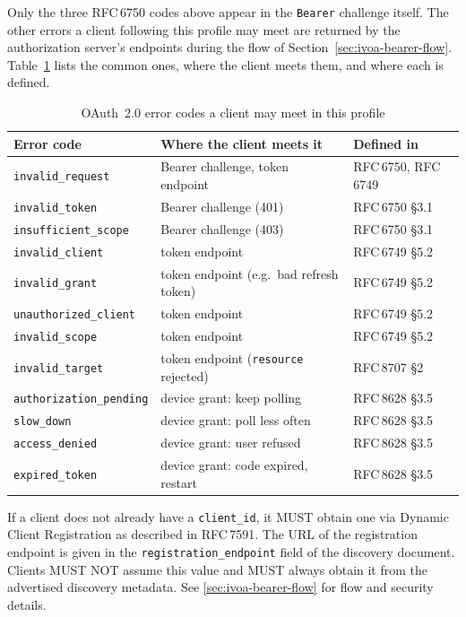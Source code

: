 \documentclass[11pt,a4paper]{ivoa}
\newcommand{\rfc}[1]{RFC\,#1}
\begin{document}
Only the three \rfc{6750} codes above appear in the \verb|Bearer| challenge
itself. The other errors a client following this profile may meet are
returned by the authorization server's endpoints during the flow of
Section~\ref{sec:ivoa-bearer-flow}. Table~\ref{table:oAuthCodes} lists the
common ones, where the client meets them, and where each is defined.
\begin{table}[]
\centering
\small
\begin{tabular}{lll}
\textbf{Error code} & \textbf{Where the client meets it} & \textbf{Defined in} \\
\hline
{\tt invalid\_request} & Bearer challenge, token endpoint & \rfc{6750}, \rfc{6749} \\
{\tt invalid\_token} & Bearer challenge (401) & \rfc{6750} \S3.1 \\
{\tt insufficient\_scope} & Bearer challenge (403) & \rfc{6750} \S3.1 \\
\hline
{\tt invalid\_client} & token endpoint & \rfc{6749} \S5.2 \\
{\tt invalid\_grant} & token endpoint (e.g.\ bad refresh token) & \rfc{6749} \S5.2 \\
{\tt unauthorized\_client} & token endpoint & \rfc{6749} \S5.2 \\
{\tt invalid\_scope} & token endpoint & \rfc{6749} \S5.2 \\
{\tt invalid\_target} & token endpoint ({\tt resource} rejected) & \rfc{8707} \S2 \\
\hline
{\tt authorization\_pending} & device grant: keep polling & \rfc{8628} \S3.5 \\
{\tt slow\_down} & device grant: poll less often & \rfc{8628} \S3.5 \\
{\tt access\_denied} & device grant: user refused & \rfc{8628} \S3.5 \\
{\tt expired\_token} & device grant: code expired, restart & \rfc{8628} \S3.5 \\
\end{tabular}
\caption{OAuth~2.0 error codes a client may meet in this profile}
\label{table:oAuthCodes}
\end{table}

If a client does not already have a \verb|client_id|, it MUST obtain one via
Dynamic Client Registration as described in \rfc{7591}. The URL of the
registration endpoint is given in the \verb|registration_endpoint| field of
the discovery document. Clients MUST NOT assume this value and MUST always
obtain it from the advertised discovery metadata. See
\ref{sec:ivoa-bearer-flow} for flow and security details.
\end{document}
